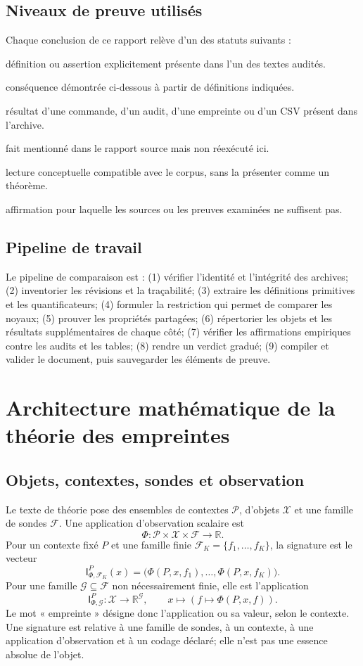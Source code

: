 \documentclass[11pt,a4paper,oneside]{report}
\newcommand{\R}{\mathbb R}
\newcommand{\X}{\mathcal X}
\newcommand{\Pcal}{\mathcal P}
\newcommand{\Fcal}{\mathcal F}
\newcommand{\Gcal}{\mathcal G}
\newcommand{\I}{\mathsf I}
\begin{document}
\section{Niveaux de preuve utilisés}
Chaque conclusion de ce rapport relève d'un des statuts suivants :
\begin{description}[style=nextline]
\item[Source] définition ou assertion explicitement présente dans l'un des textes audités.
\item[Déduction] conséquence démontrée ci-dessous à partir de définitions indiquées.
\item[Constat technique] résultat d'une commande, d'un audit, d'une empreinte ou d'un CSV présent dans l'archive.
\item[Rapporté] fait mentionné dans le rapport source mais non réexécuté ici.
\item[Interprétation] lecture conceptuelle compatible avec le corpus, sans la présenter comme un théorème.
\item[Non établi] affirmation pour laquelle les sources ou les preuves examinées ne suffisent pas.
\end{description}

\section{Pipeline de travail}
Le pipeline de comparaison est : (1) vérifier l'identité et l'intégrité des archives; (2) inventorier les révisions et la traçabilité; (3) extraire les définitions primitives et les quantificateurs; (4) formuler la restriction qui permet de comparer les noyaux; (5) prouver les propriétés partagées; (6) répertorier les objets et les résultats supplémentaires de chaque côté; (7) vérifier les affirmations empiriques contre les audits et les tables; (8) rendre un verdict gradué; (9) compiler et valider le document, puis sauvegarder les éléments de preuve.

\chapter{Architecture mathématique de la théorie des empreintes}
\section{Objets, contextes, sondes et observation}
Le texte de théorie pose des ensembles de contextes \(\Pcal\), d'objets \(\X\) et une famille de sondes \(\Fcal\). Une application d'observation scalaire est
\[
\Phi:\Pcal\times\X\times\Fcal\longrightarrow\R.
\]
Pour un contexte fixé \(P\) et une famille finie \(\Fcal_K=\{f_1,\ldots,f_K\}\), la signature est le vecteur
\[
\I^{P}_{\Phi,\Fcal_K}(x)=\bigl(\Phi(P,x,f_1),\ldots,\Phi(P,x,f_K)\bigr).
\]
Pour une famille \(\Gcal\subseteq\Fcal\) non nécessairement finie, elle est l'application
\[
\I^{P}_{\Phi,\Gcal}:\X\to\R^{\Gcal},\qquad
x\mapsto (f\mapsto\Phi(P,x,f)).
\]
Le mot « empreinte » désigne donc l'application ou sa valeur, selon le contexte. Une signature est relative à une famille de sondes, à un contexte, à une application d'observation et à un codage déclaré; elle n'est pas une essence absolue de l'objet.
\end{document}
